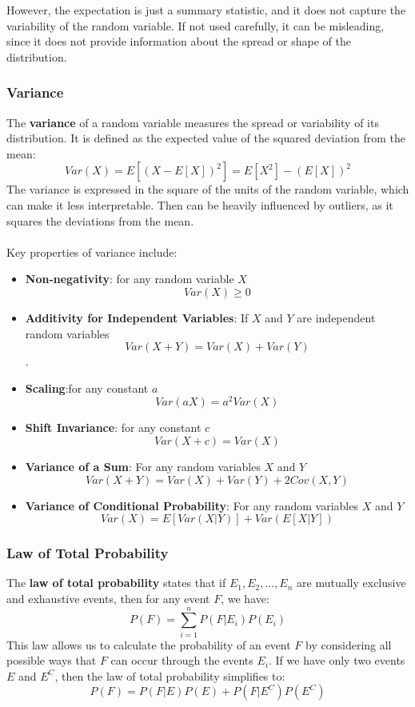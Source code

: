 However, the expectation is just a summary statistic, and it does not capture the variability of the random variable.
If not used carefully, it can be misleading, since it does not provide information about the spread or shape of the distribution.

\subsubsection{Variance}
The \textbf{variance} of a random variable measures the spread or variability of its distribution.
It is defined as the expected value of the squared deviation from the mean:
\begin{equation}
    Var(X) = E[(X - E[X])^2] = E[X^2] - (E[X])^2
\end{equation}
The variance is expressed in the square of the units of the random variable, which can make it less interpretable.
Then can be heavily influenced by outliers, as it squares the deviations from the mean.
\\\\
Key properties of variance include:
\begin{itemize}
    \item \textbf{Non-negativity}: for any random variable $X$
        \[
            Var(X) \geq 0
        \]
    \item \textbf{Additivity for Independent Variables}: If $X$ and $Y$ are independent random variables
        \[
            Var(X + Y) = Var(X) + Var(Y)
        \].
    \item \textbf{Scaling}:for any constant $a$
        \[
            Var(aX) = a^2 Var(X)
        \]
    \item \textbf{Shift Invariance}: for any constant $c$
        \[
            Var(X + c) = Var(X)
        \]
    \item \textbf{Variance of a Sum}: For any random variables $X$ and $Y$
    \[
        Var(X + Y) = Var(X) + Var(Y) + 2Cov(X, Y)
    \]
    \item \textbf{Variance of Conditional Probability}: For any random variables $X$ and $Y$
    \[
        Var(X) = E[Var(X|Y)] + Var(E[X|Y])
    \]
\end{itemize}

\subsubsection{Law of Total Probability} %
The \textbf{law of total probability} states that if $E_1, E_2, ..., E_n$ are mutually exclusive and exhaustive events, then for any event $F$, we have:
\begin{equation}
    P(F) = \sum_{i=1}^{n} P(F|E_i) P(E_i)
\end{equation}
This law allows us to calculate the probability of an event $F$ by considering all possible ways that $F$ can occur through the events $E_i$.
If we have only two events $E$ and $E^C$, then the law of total probability simplifies to:
\begin{equation}
    P(F) = P(F|E) P(E) + P(F|E^C) P(E^C)
\end{equation}

